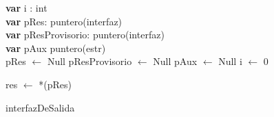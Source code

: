 	\begin{algorithm}[H]
	
	
\textbf{var} i : int\\
\textbf{var} pRes: puntero(interfaz)\\
\textbf{var} pResProvisorio: puntero(interfaz)\\
\textbf{var} pAux puntero(estr) 	\\

pRes $\leftarrow$ Null
pResProvisorio $\leftarrow$ Null
pAux $\leftarrow$ Null
i $\leftarrow$ 0


\BlankLine 


res $\leftarrow$ *(pRes)


 \caption{interfazDeSalida}
   \end{algorithm}
